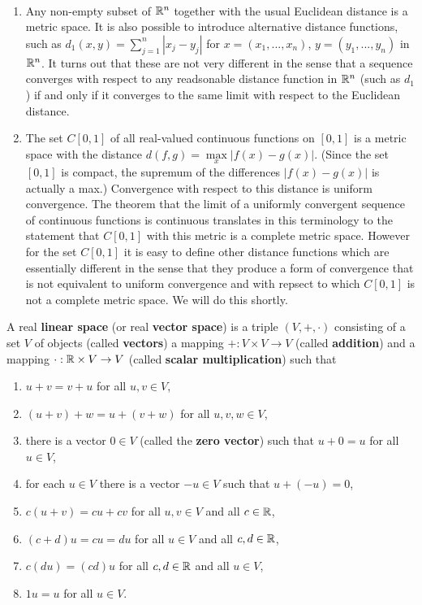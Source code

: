\pagebreak
\begin{ex}~%
	\begin{enumerate}
	\item Any non-empty subset of $\mathbb{R}^n$ together with the usual Euclidean distance 
		is a metric space. It is also possible to introduce alternative distance 
		functions, such as $d_1(x,y) = \sum\limits_{j=1}^n|x_j-y_j|$ for 
		$x=(x_1,...,x_n)$, $y=(y_1,...,y_n)$ in $\mathbb{R}^n$. It turns out that these 
		are not very different in the sense that a sequence converges with respect 
		to any readsonable distance function in $\mathbb{R}^n$ (such as $d_1$) if and only 
		if it converges to the same limit with respect to the Euclidean distance.
	\item The set $C[0,1]$ of all real-valued continuous functions on $[0,1]$ is a 
		metric space with the distance $d(f,g) = \max\limits_{x}|f(x)-g(x)|$. 
		(Since the set $[0,1]$ is compact, the supremum of the differences 
		$|f(x)-g(x)|$ is actually a max.) Convergence with respect to this distance 
		is uniform convergence. The theorem that the limit of a uniformly convergent 
		sequence of continuous functions is continuous translates in this terminology 
		to the statement that $C[0,1]$ with this metric is a complete metric space. 
		However for the set $C[0,1]$ it is easy to define other distance functions 
		which are essentially different in the sense that they produce a form of 
		convergence that is not equivalent to uniform convergence and with repsect to 
		which $C[0,1]$ is not a complete metric space. We will do this shortly. 
	\end{enumerate}
\end{ex}

\begin{defn} %
	A real \textbf{linear space} (or real \textbf{vector space}) is a triple 
	$(V,+,\cdot)$ consisting of a set $V$ of objects (called \textbf{vectors}) a 
	mapping $+:V\times V\rightarrow V$ (called \textbf{addition}) and a mapping 
	$\cdot : \mathbb{R} \times V \rightarrow V$ (called \textbf{scalar multiplication}) 
	such that 
	\begin{enumerate}
	\item $u + v = v + u$ for all $u, v \in V$, 
	\item $(u + v) + w = u + (v + w)$ for all $u, v, w \in V$, 
	\item there is a vector $0 \in V$ (called the \textbf{zero vector}) such that 
		$u + 0 = u$ for all $u \in V$,
	\item for each $u \in V$ there is a vector $-u \in V$ such that $u + (-u) = 0$, 
	\item $c(u + v) = cu + cv$ for all $u, v \in V$ and all $c \in \mathbb{R}$, 
	\item $(c + d)u = cu = du$ for all $u \in V$ and all $c, d\in \mathbb{R}$,  
	\item $c(du) = (cd)u$ for all $c, d \in \mathbb{R}$ and all $u \in V$, 
	\item $1u = u$ for all $u \in V$. 
	\end{enumerate}
\end{defn}

